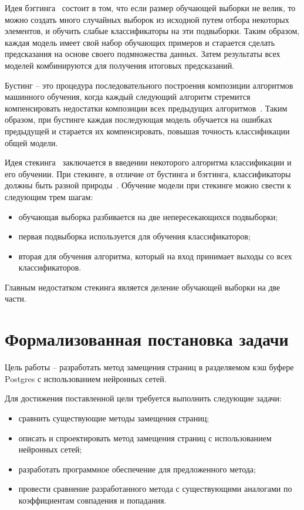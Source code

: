 Идея бэггинга~\cite{ntayagabiri2025omic} состоит в том, что если размер обучающей выборки не велик, то можно создать много случайных выборок из исходной путем отбора некоторых элементов, и обучить слабые классификаторы на эти подвыборки. Таким образом, каждая модель имеет свой набор обучающих примеров и старается сделать предсказания на основе своего подмножества данных. Затем результаты всех моделей комбинируются для получения итоговых предсказаний.

Бустинг -- это процедура последовательного построения композиции алгоритмов машинного обучения, когда каждый следующий алгоритм стремится компенсировать недостатки композиции всех предыдущих алгоритмов~\cite{ansambles}. Таким образом, при бустинге каждая последующая модель обучается на ошибках предыдущей и старается их компенсировать, повышая точность классификации общей модели.

Идея стекинга~\cite{daza2024stacking} заключается в введении некоторого алгоритма классификации и его обучении. При стекинге, в отличие от бустинга и бэггинга, классификаторы должны быть разной природы~\cite{ansambles}. Обучение модели при стекинге можно свести к следующим трем шагам:
\begin{itemize}
	\item обучающая выборка разбивается на две непересекающихся подвыборки;
	\item первая подвыборка используется для обучения классификаторов;
	\item вторая для обучения алгоритма, который на вход принимает выходы со всех классификаторов.
\end{itemize}

Главным недостатком стекинга является деление обучающей выборки на две части.

\section{Формализованная постановка задачи}
Цель работы -- разработать метод замещения страниц в разделяемом кэш буфере Postgres с использованием нейронных сетей.

Для достижения поставленной цели требуется выполнить следующие задачи:
\begin{itemize}
	\item сравнить существующие методы замещения страниц;
	\item описать и спроектировать метод замещения страниц с использованием нейронных сетей;
	\item разработать программное обеспечение для предложенного метода;
	\item провести сравнение разработанного метода с существующими аналогами по коэффициентам совпадения и попадания.
\end{itemize}

